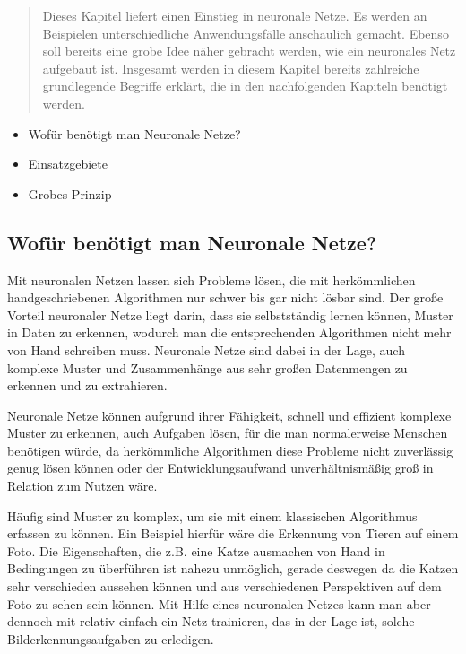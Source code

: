 \begin{tcolorbox}[title={Inhalt}]
  \begin{quotation}\noindent
      Dieses Kapitel liefert einen Einstieg in neuronale Netze. Es werden an Beispielen unterschiedliche Anwendungsfälle anschaulich gemacht.
      Ebenso soll bereits eine grobe Idee näher gebracht werden, wie ein neuronales Netz aufgebaut ist.
      Insgesamt werden in diesem Kapitel bereits zahlreiche grundlegende Begriffe erklärt, die in den nachfolgenden Kapiteln benötigt werden.
  \end{quotation}
  \begin{itemize}  
    \item Wofür benötigt man Neuronale Netze?
    \item Einsatzgebiete
    \item Grobes Prinzip
  \end{itemize}
\end{tcolorbox}

\subsection{Wofür benötigt man Neuronale Netze?}\label{subsec:einleitung_nn:wofuer_nn}
Mit neuronalen Netzen lassen sich Probleme lösen, die mit herkömmlichen handgeschriebenen Algorithmen nur schwer bis gar nicht lösbar sind.
Der große Vorteil neuronaler Netze liegt darin, dass sie selbstständig lernen können, Muster in Daten zu erkennen, wodurch man die entsprechenden Algorithmen nicht mehr von Hand schreiben muss.
Neuronale Netze sind dabei in der Lage, auch komplexe Muster und Zusammenhänge aus sehr großen Datenmengen zu erkennen und zu extrahieren.

Neuronale Netze können aufgrund ihrer Fähigkeit, schnell und effizient komplexe Muster zu erkennen, auch Aufgaben lösen, für die man normalerweise Menschen benötigen würde, da herkömmliche Algorithmen diese Probleme nicht zuverlässig genug lösen können oder der Entwicklungsaufwand unverhältnismäßig groß in Relation zum Nutzen wäre.

Häufig sind Muster zu komplex, um sie mit einem klassischen Algorithmus erfassen zu können.
Ein Beispiel hierfür wäre die Erkennung von Tieren auf einem Foto. Die Eigenschaften, die z.B. eine Katze ausmachen von Hand in Bedingungen zu überführen ist nahezu unmöglich, gerade deswegen da die Katzen sehr verschieden aussehen können und aus verschiedenen Perspektiven auf dem Foto zu sehen sein können.
Mit Hilfe eines neuronalen Netzes kann man aber dennoch mit relativ einfach ein Netz trainieren, das in der Lage ist, solche Bilderkennungsaufgaben zu erledigen.

